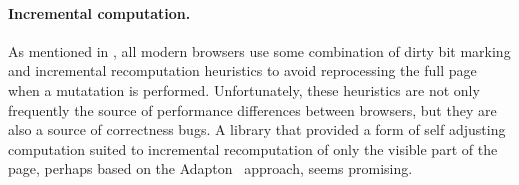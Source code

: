 \paragraph{Incremental computation.} As mentioned in ,
all modern browsers use some combination of dirty bit marking and incremental
recomputation heuristics to avoid reprocessing the full page when
a mutatation is performed.
Unfortunately, these heuristics are not only frequently the source of
performance differences between browsers, but they are also a source of
correctness bugs.
A library that provided a form of self adjusting computation suited to
incremental recomputation of only the visible part of the page, perhaps
based on the Adapton~\cite{adapton} approach, seems promising.

